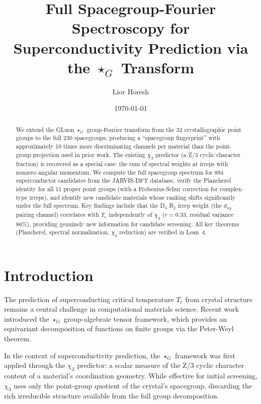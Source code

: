 \documentclass[aps,prb,twocolumn,superscriptaddress]{revtex4-2}
\newcommand{\starG}{\star_G}
\newcommand{\Tc}{T_{\mathrm{c}}}
\begin{document}
\title{Full Spacegroup-Fourier Spectroscopy for\\
  Superconductivity Prediction via the $\starG$ Transform}

\author{Lior Horesh}

\date{\today}

\begin{abstract}
We extend the GLuon $\starG$ group-Fourier transform from the 32
crystallographic point groups to the full 230 spacegroups, producing
a ``spacegroup fingerprint'' with approximately 10 times more
discriminating channels per material than the point-group projection
used in prior work. The existing $\chi_3$ predictor (a Z/3 cyclic
character fraction) is recovered as a special case: the sum of spectral
weights at irreps with nonzero angular momentum. We compute the full
spacegroup spectrum for 894 superconductor candidates from the
JARVIS-DFT database, verify the Plancherel identity for all 11 proper
point groups (with a Frobenius-Schur correction for complex-type
irreps), and identify new candidate materials whose ranking shifts
significantly under the full spectrum. Key findings include that the
D$_4$ B$_2$ irrep weight (the $d_{xy}$ pairing channel) correlates
with $\Tc$ independently of $\chi_3$ ($r = 0.33$, residual variance
$86\%$), providing genuinely new information for candidate screening.
All key theorems (Plancherel, spectral normalization, $\chi_3$ reduction)
are verified in Lean~4.
\end{abstract}

\maketitle

\section{Introduction}
\label{sec:intro}

The prediction of superconducting critical temperature $\Tc$ from
crystal structure remains a central challenge in computational materials
science. Recent work~\cite{hoyos2025starg,horesh2026hierarchical}
introduced the $\starG$ group-algebraic tensor framework, which
provides an equivariant decomposition of functions on finite groups
via the Peter-Weyl theorem.

In the context of superconductivity prediction, the $\starG$ framework
was first applied through the $\chi_3$ predictor: a scalar measure of
the Z/3 cyclic character content of a material's coordination geometry.
While effective for initial screening, $\chi_3$ uses only the
point-group quotient of the crystal's spacegroup, discarding
the rich irreducible structure available from the full group
decomposition.
\end{document}
